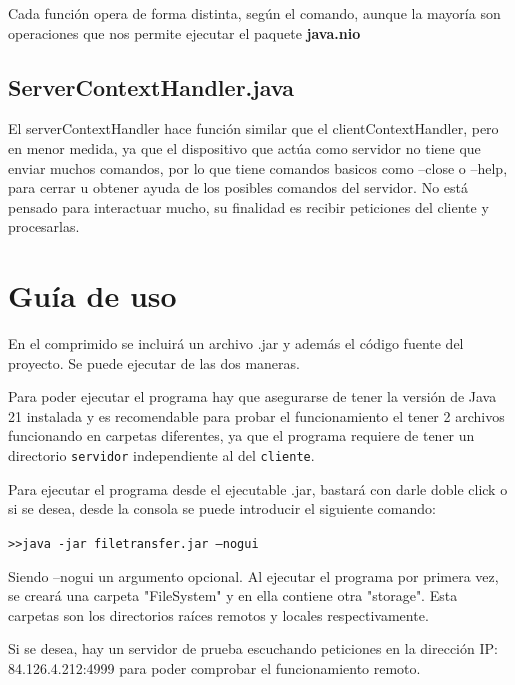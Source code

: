 \documentclass[a4paper, 12pt]{report}
\begin{document}
Cada función opera de forma distinta, según el comando, aunque la mayoría son operaciones que nos permite ejecutar el paquete \textbf{java.nio}

\section{ServerContextHandler.java}

El serverContextHandler hace función similar que el clientContextHandler, pero en menor medida, ya que el
dispositivo que actúa como servidor no tiene que enviar muchos comandos, por lo que tiene comandos basicos como
--close o --help, para cerrar u obtener ayuda de los posibles comandos del servidor. No está pensado para interactuar mucho, su finalidad es recibir peticiones del cliente y procesarlas.

\chapter{Guía de uso}
En el comprimido se incluirá un archivo .jar y además el código fuente del proyecto. Se puede ejecutar de las dos maneras.

Para poder ejecutar el programa hay que asegurarse de tener la versión de Java 21 instalada y es recomendable para probar el funcionamiento el tener 2 archivos funcionando en carpetas diferentes, ya que el programa requiere de tener un directorio \texttt{servidor} independiente al del \texttt{cliente}.

Para ejecutar el programa desde el ejecutable .jar, bastará con darle doble click o si se desea, desde la consola se puede introducir el siguiente comando:

\texttt{\textgreater\textgreater java -jar filetransfer.jar --nogui}

Siendo --nogui un argumento opcional.
Al ejecutar el programa por primera vez, se creará una carpeta "FileSystem" y en ella contiene otra "storage".
Esta carpetas son los directorios raíces remotos y locales respectivamente.

Si se desea, hay un servidor de prueba escuchando peticiones en la dirección IP: 84.126.4.212:4999 para poder comprobar el funcionamiento remoto.

\printbibliography
\end{document}

